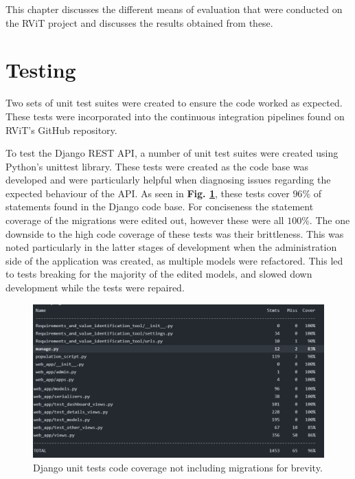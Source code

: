 \documentclass[l4proj.tex]{subfiles}
\begin{document}
This chapter discusses the different means of evaluation that were conducted on the RViT project and discusses the results obtained from these.

\section{Testing}
Two sets of unit test suites were created to ensure the code worked as expected. These tests were incorporated into the continuous integration pipelines found on RViT's GitHub repository.

To test the Django REST API, a number of unit test suites were created using Python's unittest library. These tests were created as the code base was developed and were particularly helpful when diagnosing issues regarding the expected behaviour of the API. As seen in \textbf{Fig. \ref{fig:django unit tests}}, these tests cover $96\%$ of statements found in the Django code base. For conciseness the statement coverage of the migrations were edited out, however these were all $100\%$. The one downside to the high code coverage of these tests was their brittleness. This was noted particularly in the latter stages of development when the administration side of the application was created, as multiple models were refactored. This led to tests breaking for the majority of the edited models, and slowed down development while the tests were repaired.
 

\begin{figure}[h!]
\begin{center}
\includegraphics[scale=0.5]{dissertation/images/DjangoUnitTests.png}
\caption{Django unit tests code coverage not including migrations for brevity.}
\label{fig:django unit tests} 
\end{center}
\end{figure}
\end{document}
